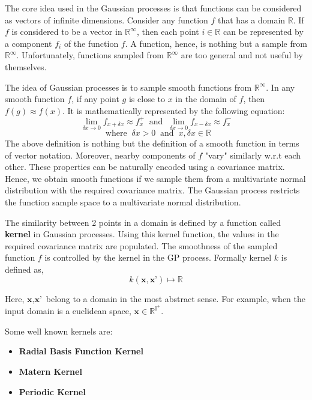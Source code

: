 \documentclass[11pt]{report}
\begin{document}
The core idea used in the Gaussian processes is that functions can be considered as vectors of infinite dimensions.
Consider any function $f$ that has a domain $\mathbb{R}$.
If $f$ is considered to be a vector in $\mathbb{R}^{\infty}$,
then each point $i \in \mathbb{R}$  can be represented by a component $f_i$ of the function $f$.
A function,  hence,  is nothing but a sample from $\mathbb{R}^{\infty}$.
Unfortunately, functions sampled from $\mathbb{R}^{\infty}$ are too general and not useful by themselves.

The idea of Gaussian processes is to sample smooth functions from $\mathbb{R}^{\infty}$.
In any smooth function $f$, if any point $g$ is close to $x$ in the domain of $f$, then $f(g) \approx f(x)$.
It is mathematically represented by the following equation:
$$
\lim_{\delta x \to 0} f_{x + \delta x} \approx f^{+}_x  \;\; \textrm{and} \;\; 
\lim_{\delta x \to 0} f_{x - \delta x} \approx f^{-}_x 
$$
$$\;\; \textrm{where} \;\; \delta x > 0 \;\; \textrm{and} \;\; x, \delta x \in \mathbb{R}
$$
The above definition is nothing but the definition of a smooth function in terms of vector notation. 
Moreover, nearby components of $f$ "vary" similarly w.r.t each other.
These properties can be naturally encoded using a covariance matrix.
Hence, we obtain smooth functions if we sample them from a multivariate normal distribution with the required covariance matrix.
The Gaussian process restricts the function sample space to a multivariate normal distribution.

The similarity between 2 points in a domain is defined by a function called \textbf{kernel} in Gaussian processes.
Using this kernel function, the values in the required covariance matrix are populated.
The smoothness of the sampled function $f$ is controlled by the kernel in the GP process.
Formally kernel $k$ is defined as,
$$
k(\textbf{x}, \textbf{x'}) \mapsto \mathbb{R}
$$

Here, $\textbf{x}, \textbf{x'}$ belong to a domain in the most abstract sense.
For example,  when the input domain is a euclidean space,  $\textbf{x} \in \mathbb{R}^{\mathbb{I}^+}$.

Some well known kernels are:
\begin{itemize}
\item \textbf{Radial Basis Function Kernel}
\item \textbf{Matern Kernel}
\item \textbf{Periodic Kernel}
\end{itemize}
\end{document}
